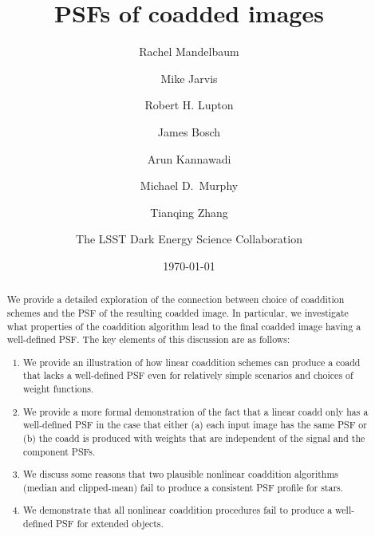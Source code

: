 \documentclass{aastex63}
\begin{document}
\title{PSFs of coadded images}
\author[0000-0003-2271-1527]{Rachel Mandelbaum}

\author[0000-0002-4179-5175]{Mike Jarvis}

\author[0000-0003-1666-0962]{Robert H. Lupton}

\author[0000-0003-2759-5764]{James Bosch}

\author[0000-0001-8783-6529]{Arun Kannawadi}

\author{Michael D.\ Murphy}

\author[0000-0002-5596-198X]{Tianqing Zhang}


\author{The LSST Dark Energy Science Collaboration}
\noaffiliation

\date{\today}

\begin{abstract}
    We provide a detailed exploration of the connection between choice of coaddition schemes and the PSF of the resulting coadded image.  In particular, we investigate what properties of the coaddition algorithm lead to the final coadded image having a well-defined PSF.  The key elements of this discussion are as follows: 
    \begin{enumerate}
        \item We provide an illustration of how linear coaddition schemes can produce a coadd that lacks a well-defined PSF even for relatively simple scenarios and choices of weight functions.  
        \item We provide a more formal demonstration of the fact that a linear coadd only has a well-defined PSF in the case that either (a) each input image has the same PSF or (b) the coadd is produced with weights that are independent of the signal and the component PSFs.
        \item We discuss some reasons that two plausible nonlinear coaddition algorithms (median and clipped-mean) fail to produce a consistent PSF profile for stars.
        \item We demonstrate that all nonlinear coaddition procedures fail to produce a well-defined PSF for extended objects.
    \end{enumerate}
\end{abstract}
\end{document}
